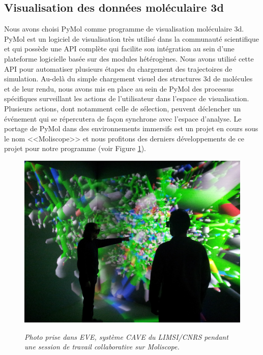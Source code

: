 \subsection{Visualisation des données moléculaire 3d}

Nous avons choisi PyMol \cite{delano_pymol_2002} comme programme de visualisation moléculaire 3d. PyMol est un logiciel de visualisation très utilisé dans la communauté scientifique et qui possède une API complète qui facilite son intégration au sein d'une plateforme logicielle basée sur des modules hétérogènes. 
Nous avons utilisé cette API pour automatiser plusieurs étapes du chargement des trajectoires de simulation. Au-delà du simple chargement visuel des structures 3d de molécules et de leur rendu, nous avons mis en place au sein de PyMol des processus spécifiques surveillant les actions de l'utilisateur dans l'espace de visualisation. 
Plusieurs actions, dont notamment celle de sélection, peuvent déclencher un événement qui se répercutera de façon synchrone avec l'espace d'analyse. Le portage de PyMol dans des environnements immersifs est un projet en cours sous le nom <<Moliscope>> et nous profitons des derniers développements de ce projet pour notre programme (voir Figure \ref{Fig:multi_collaboratif}).

\begin{figure}
  \centering
  {\includegraphics[width=.75\linewidth]{./figures/ch5/multi_collaboratif}}
    \caption{{\it Photo prise dans EVE, système CAVE du LIMSI/CNRS pendant une session de travail collaborative sur Moliscope.}}
  \label{Fig:multi_collaboratif}
  \hspace{0.3cm}
\end{figure}


